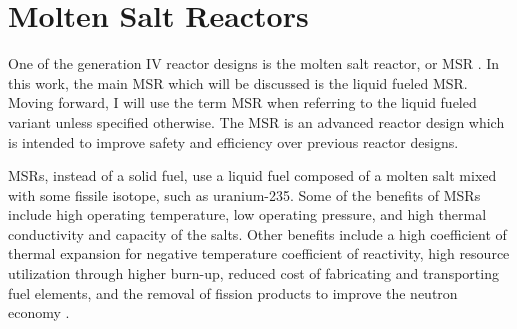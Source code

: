 \renewcommand*\descriptionlabel[1]{\hspace\leftmargin$#1$}
\setcounter{tocdepth}{5}
\setcounter{secnumdepth}{5}

\section{Molten Salt Reactors}

One of the generation IV reactor designs is the molten salt reactor, or MSR \cite{kelly_generation_2014}. 
In this work, the main MSR which will be discussed is the liquid fueled MSR.
Moving forward, I will use the term MSR when referring to the liquid fueled variant unless specified otherwise.
The MSR is an advanced reactor design which is intended to improve safety and efficiency over previous reactor designs.




MSRs, instead of a solid fuel, use a liquid fuel composed of a molten salt mixed with some fissile isotope, such as uranium-235. Some of the benefits of MSRs include high operating temperature, low operating pressure, and high thermal conductivity and capacity of the salts. Other benefits include a high coefficient of thermal expansion for negative temperature coefficient of reactivity, high resource utilization through higher burn-up, reduced cost of fabricating and transporting fuel elements, and the removal of fission products to improve the neutron economy \cite{serp_molten_2014}.

